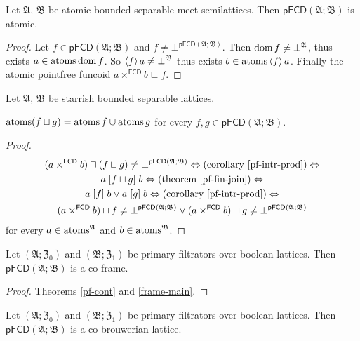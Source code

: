 \begin{thm}\label{pfcd-atomic}
Let $\mathfrak{A}$, $\mathfrak{B}$ be atomic bounded separable meet-semilattices.
Then $\mathsf{pFCD}(\mathfrak{A};\mathfrak{B})$ is atomic.\end{thm}
\begin{proof}
Let $f\in\mathsf{pFCD}(\mathfrak{A};\mathfrak{B})$ and $f\neq\bot^{\mathsf{pFCD}(\mathfrak{A};\mathfrak{B})}$.
Then $\operatorname{dom} f\neq\bot^{\mathfrak{A}}$, thus exists $a\in\operatorname{atoms}\operatorname{dom} f$.
So $\left\langle f\right\rangle a\neq\bot^{\mathfrak{B}}$ thus exists $b\in\operatorname{atoms}\left\langle f\right\rangle a$.
Finally the atomic pointfree funcoid $a\times^{\mathsf{FCD}}b\sqsubseteq f$.\end{proof}

\begin{prop}
Let $\mathfrak{A}$, $\mathfrak{B}$ be starrish bounded separable lattices.

$\operatorname{atoms}(f\sqcup g)=\operatorname{atoms} f\cup\operatorname{atoms} g$ for every $f,g\in\mathsf{pFCD}(\mathfrak{A};\mathfrak{B})$.\end{prop}
\begin{proof}
~
\begin{multline*}
(a\times^{\mathsf{FCD}}b)\sqcap(f\sqcup g)\neq\bot^{\mathsf{pFCD}(\mathfrak{A};\mathfrak{B})}
\Leftrightarrow \text{(corollary~\ref{pf-intr-prod})} \Leftrightarrow \\
a\mathrel{\left[f\sqcup g\right]}b\Leftrightarrow \text{(theorem~\ref{pf-fin-join})} \Leftrightarrow \\ a\mathrel{\left[f\right]}b\vee a\mathrel{\left[g\right]}b
\Leftrightarrow \text{(corollary~\ref{pf-intr-prod})} \Leftrightarrow \\
(a\times^{\mathsf{FCD}}b)\sqcap f\neq\bot^{\mathsf{pFCD}(\mathfrak{A};\mathfrak{B})}\vee(a\times^{\mathsf{FCD}}b)\sqcap g\neq\bot^{\mathsf{pFCD}(\mathfrak{A};\mathfrak{B})}
\end{multline*}
for every $a\in\operatorname{atoms}^{\mathfrak{A}}$ and $b\in\operatorname{atoms}^{\mathfrak{B}}$.\end{proof}
\begin{thm}
Let $(\mathfrak{A};\mathfrak{Z}_{0})$ and $(\mathfrak{B};\mathfrak{Z}_{1})$
be primary filtrators over boolean lattices. Then $\mathsf{pFCD}(\mathfrak{A};\mathfrak{B})$
is a co-frame.\end{thm}
\begin{proof}
Theorems \ref{pf-cont} and \ref{frame-main}.\end{proof}
\begin{cor}
Let $(\mathfrak{A};\mathfrak{Z}_{0})$ and $(\mathfrak{B};\mathfrak{Z}_{1})$
be primary filtrators over boolean lattices. Then $\mathsf{pFCD}(\mathfrak{A};\mathfrak{B})$
is a co-brouwerian lattice.\end{cor}
